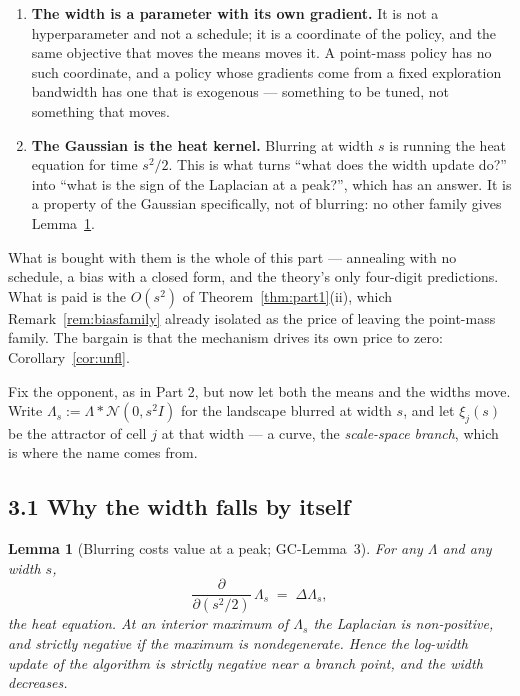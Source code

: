 \documentclass[11pt]{article}
\newtheorem{lemma}[theorem]{Lemma}
\theoremstyle{definition}
\newcommand{\cN}{\mathcal{N}}
\newcommand{\GC}[1]{\textsf{GC-#1}}
\begin{document}
\begin{enumerate}[leftmargin=1.4em]
\item \textbf{The width is a parameter with its own gradient.} It is not a
  hyperparameter and not a schedule; it is a coordinate of the policy, and the
  same objective that moves the means moves it. A point-mass policy has no such
  coordinate, and a policy whose gradients come from a fixed exploration bandwidth
  has one that is exogenous --- something to be tuned, not something that moves.
\item \textbf{The Gaussian is the heat kernel.} Blurring at width $s$ is running
  the heat equation for time $s^2/2$. This is what turns ``what does the width
  update do?'' into ``what is the sign of the Laplacian at a peak?'', which has an
  answer. It is a property of the Gaussian specifically, not of blurring: no other
  family gives Lemma~\ref{lem:heat}.
\end{enumerate}

\noindent
What is bought with them is the whole of this part --- annealing with no schedule,
a bias with a closed form, and the theory's only four-digit predictions. What is
paid is the $O(s^2)$ of Theorem~\ref{thm:part1}(ii), which
Remark~\ref{rem:biasfamily} already isolated as the price of leaving the
point-mass family. The bargain is that the mechanism drives its own price to zero:
Corollary~\ref{cor:unfl}.

Fix the opponent, as in Part 2, but now let both the means and the widths move.
Write $\Lambda_s := \Lambda * \cN(0, s^2 I)$ for the landscape blurred at width
$s$, and let $\xi_j(s)$ be the attractor of cell $j$ at that width --- a curve, the
\emph{scale-space branch}, which is where the name comes from.

\subsection*{3.1 Why the width falls by itself}

\begin{lemma}[Blurring costs value at a peak; \GC{Lemma~3}]\label{lem:heat}
For any $\Lambda$ and any width $s$,
\[
  \frac{\partial}{\partial (s^2/2)}\,\Lambda_s \;=\; \Delta \Lambda_s ,
\]
the heat equation. At an interior maximum of $\Lambda_s$ the Laplacian is
non-positive, and strictly negative if the maximum is nondegenerate. Hence the
log-width update of the algorithm is strictly negative near a branch point, and
the width decreases.
\end{lemma}
\end{document}
